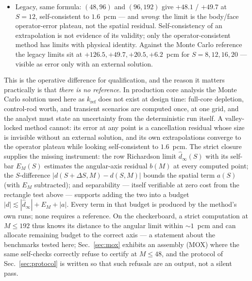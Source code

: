 \documentclass[11pt,a4paper]{article}
\begin{document}
\begin{itemize}
and negative on fine ones), and an $O(S^{-1})$ tail beyond the
crossing.  This is a \emph{characterized} residual: piecewise
single-signed, extrapolable along $S$ like any discretization error,
and verifiable by running one more $S$ level --- not the wandering
per-point sign reversals of Table~\ref{tab:rows}.
\item Legacy, same formula: $(48,96)$ and $(96,192)$ give $+48.1$ /
$+49.7$ at $S{=}12$, self-consistent to $1.6$~pcm --- and
\emph{wrong}: the limit is the body/face operator-error plateau, not
the spatial residual.  Self-consistency of an extrapolation is not
evidence of its validity; only the operator-consistent method has
limits with physical identity.  Against the Monte Carlo reference the
legacy limits sit at $+126.5, +49.7, +20.5, +6.2$~pcm for
$S=8,12,16,20$ --- visible as error only with an external solution.
\end{itemize}
This is the operative difference for qualification, and the reason it
matters practically is that \emph{there is no reference}.  In
production core analysis the Monte Carlo solution used here as
$k_{\mathrm{ref}}$ does not exist at design time: full-core
depletion, control-rod worth, and transient scenarios are computed
once, at one grid, and the analyst must state an uncertainty from the
deterministic run itself.  A valley-locked method cannot: its error at
any point is a cancellation residual whose size is invisible without
an external solution, and its own extrapolations converge to the
operator plateau while looking self-consistent to $1.6$~pcm.  The
strict closure supplies the missing instrument: the row Richardson
limit $\hat d_\infty(S)$ with its self-bar $E_M(S)$ estimates the
angular-axis residual $b(M)$ at every computed point; the
$S$-difference $|d(S{+}\Delta S,M)-d(S,M)|$ bounds the spatial term
$a(S)$ (with $E_M$ subtracted); and separability --- itself verifiable
at zero cost from the rectangle test above --- supports adding the two
into a budget $|d| \lesssim |\hat d_\infty| + E_M + |a|$.  Every term
in that budget is produced by the method's own runs; none requires a
reference.  On the checkerboard, a strict computation at $M\le192$
thus knows its distance to the angular limit within $\sim1$~pcm and
can allocate remaining budget to the correct axis --- a statement
about the benchmarks tested here; Sec.~\ref{sec:mox} exhibits an
assembly (MOX) where the same self-checks correctly refuse to
certify at $M\le48$, and the protocol of Sec.~\ref{sec:protocol} is
written so that such refusals are an output, not a silent pass.
\end{document}
